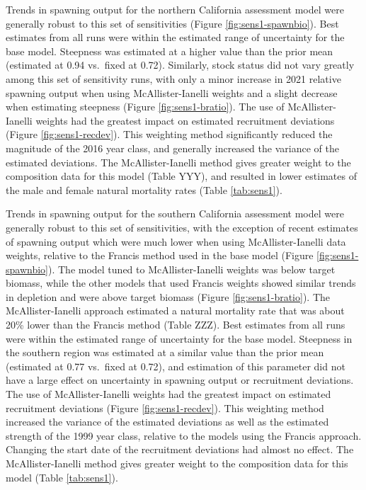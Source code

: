 \documentclass[
  english,
  a4paper,
]{article}
\begin{document}
Trends in spawning output for the northern California assessment model were generally robust to this set of sensitivities (Figure \ref{fig:sens1-spawnbio}). Best estimates from all runs were within the estimated range of uncertainty for the base model. Steepness was estimated at a higher value than the prior mean (estimated at 0.94 vs.~fixed at 0.72). Similarly, stock status did not vary greatly among this set of sensitivity runs, with only a minor increase in 2021 relative spawning output when using McAllister-Ianelli weights and a slight decrease when estimating steepness (Figure \ref{fig:sens1-bratio}). The use of McAllister-Ianelli weights had the greatest impact on estimated recruitment deviations (Figure \ref{fig:sens1-recdev}). This weighting method significantly reduced the magnitude of the 2016 year class, and generally increased the variance of the estimated deviations. The McAllister-Ianelli method gives greater weight to the composition data for this model (Table YYY), and resulted in lower estimates of the male and female natural mortality rates (Table \ref{tab:sens1}).

Trends in spawning output for the southern California assessment model were generally robust to this set of sensitivities, with the exception of recent estimates of spawning output which were much lower when using McAllister-Ianelli data weights, relative to the Francis method used in the base model (Figure \ref{fig:sens1-spawnbio}). The model tuned to McAllister-Ianelli weights was below target biomass, while the other models that used Francis weights showed similar trends in depletion and were above target biomass (Figure \ref{fig:sens1-bratio}). The McAllister-Ianelli approach estimated a natural mortality rate that was about 20\% lower than the Francis method (Table ZZZ). Best estimates from all runs were within the estimated range of uncertainty for the base model. Steepness in the southern region was estimated at a similar value than the prior mean (estimated at 0.77 vs.~fixed at 0.72), and estimation of this parameter did not have a large effect on uncertainty in spawning output or recruitment deviations. The use of McAllister-Ianelli weights had the greatest impact on estimated recruitment deviations (Figure \ref{fig:sens1-recdev}). This weighting method increased the variance of the estimated deviations as well as the estimated strength of the 1999 year class, relative to the models using the Francis approach. Changing the start date of the recruitment deviations had almost no effect. The McAllister-Ianelli method gives greater weight to the composition data for this model (Table \ref{tab:sens1}).
\end{document}
